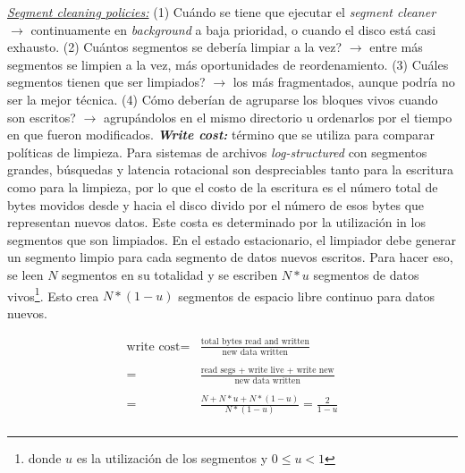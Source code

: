 \underline{\emph{Segment cleaning policies:}} (1) Cuándo se tiene que ejecutar el \emph{segment cleaner} $\to$ continuamente en \emph{background} a baja prioridad, o cuando el disco está casi exhausto. (2) Cuántos segmentos se debería limpiar a la vez? $\to$ entre más segmentos se limpien a la vez, más oportunidades de reordenamiento. (3) Cuáles segmentos tienen que ser limpiados? $\to$ los más fragmentados, aunque podría no ser la mejor técnica. (4) Cómo deberían de agruparse los bloques vivos cuando son escritos? $\to$ agrupándolos en el mismo directorio u ordenarlos por el tiempo en que fueron modificados. \emph{\textbf{Write cost:}} término que se utiliza para comparar políticas de limpieza. Para sistemas de archivos \emph{log-structured} con segmentos grandes, búsquedas y latencia rotacional son despreciables tanto para la escritura como para la limpieza, por lo que el costo de la escritura es el número total de bytes movidos desde y hacia el disco divido por el número de esos bytes que representan nuevos datos. Este costa es determinado por la utilización in los segmentos que son limpiados. En el estado estacionario, el limpiador debe generar un segmento limpio para cada segmento de datos nuevos escritos. Para hacer eso, se leen $N$ segmentos en su totalidad y se escriben $N * u$ segmentos de datos vivos\footnote{donde $u$ es la utilización de los segmentos y $0 \leq u < 1$}. Esto crea $N * (1 - u)$ segmentos de espacio libre continuo para datos nuevos. 

\begin{align*}
\text{write cost} = & \frac{\text{total bytes read and written}}{\text{new data written}} \\
                    & \\
                  = & \frac{\text{read segs + write live + write new}}{\text{new data written}} \\
                    & \\
                  = & \frac{N + N * u + N * (1-u)}{N * (1 -u)} = \frac{2}{1 - u} \\                  
\end{align*}

